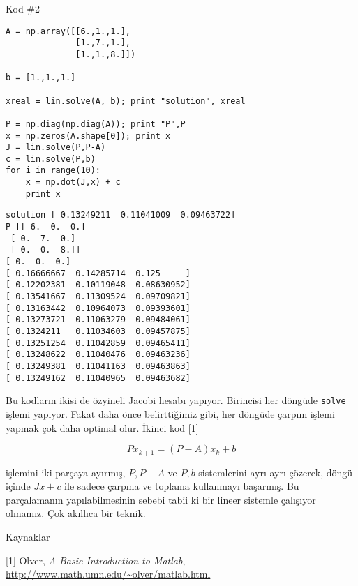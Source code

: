 \documentclass[12pt,fleqn]{article}\usepackage{../../common}
\begin{document}
Kod \#2

\begin{verbatim}
A = np.array([[6.,1.,1.],
              [1.,7.,1.],
              [1.,1.,8.]])

b = [1.,1.,1.]

xreal = lin.solve(A, b); print "solution", xreal

P = np.diag(np.diag(A)); print "P",P
x = np.zeros(A.shape[0]); print x
J = lin.solve(P,P-A)
c = lin.solve(P,b)
for i in range(10):
    x = np.dot(J,x) + c
    print x
\end{verbatim}

\begin{verbatim}
solution [ 0.13249211  0.11041009  0.09463722]
P [[ 6.  0.  0.]
 [ 0.  7.  0.]
 [ 0.  0.  8.]]
[ 0.  0.  0.]
[ 0.16666667  0.14285714  0.125     ]
[ 0.12202381  0.10119048  0.08630952]
[ 0.13541667  0.11309524  0.09709821]
[ 0.13163442  0.10964073  0.09393601]
[ 0.13273721  0.11063279  0.09484061]
[ 0.1324211   0.11034603  0.09457875]
[ 0.13251254  0.11042859  0.09465411]
[ 0.13248622  0.11040476  0.09463236]
[ 0.13249381  0.11041163  0.09463863]
[ 0.13249162  0.11040965  0.09463682]
\end{verbatim}

Bu kodların ikisi de özyineli Jacobi hesabı yapıyor. Birincisi her döngüde 
\verb!solve! işlemi yapıyor. Fakat daha önce belirttiğimiz gibi, her
döngüde çarpım işlemi yapmak çok daha optimal olur. İkinci kod [1]

$$ Px_{k+1} =  (P - A)x_k + b $$ 

işlemini iki parçaya ayırmış, $P,P-A$ ve $P,b$ sistemlerini ayrı ayrı
çözerek, döngü içinde $Jx + c$ ile sadece çarpma ve toplama kullanmayı
başarmış. Bu parçalamanın yapılabilmesinin sebebi tabii ki bir lineer
sistemle çalışıyor olmamız. Çok akıllıca bir teknik. 

Kaynaklar

[1] Olver, {\em A Basic Introduction to Matlab}, \url{http://www.math.umn.edu/~olver/matlab.html}
\end{document}
